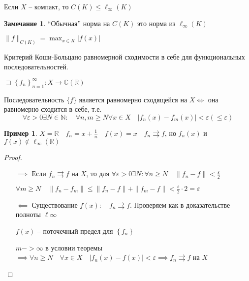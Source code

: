 \documentclass{book}
\newcommand\N{\ensuremath{\mathbb{N}}}
\newcommand\R{\ensuremath{\mathbb{R}}}
\renewcommand\C{\ensuremath{\mathbb{C}}}
\theoremstyle{definition}
\newtheorem*{note}{Замечание}
\newtheorem*{example}{Пример}
\begin{document}
    Если $X$ -- компакт, то  $C(K) \leqslant \ell _{\infty }(K)$

    \begin{note}
        ``Обычная'' норма на $C(K)$ это норма из  $\ell _{\infty }(K)$

        $\|f\|_{C(K)} = \max_{x\in K} |f(x)|$
    \end{note}

    \begin{theorem}
        Критерий Коши-Больцано равномерной сходимости в себе для функциональных последовательностей.

        $\sqsupset \left\{ f_n \right\} _{n=1}^{\infty }: X\to \C(\R)$

        Последовательность $\{f\}$ является равномерно сходящейся на  $X \iff $ она равномерно сходится в себе, т.е. \[\forall \varepsilon >0 \exists N\in \N : \quad \forall n,m\geqslant N\forall x\in X\quad |f_n(x) - f_m(x)|<\varepsilon\left( \leqslant \varepsilon \right) \]
    \end{theorem}

    \begin{example}
        $X = \R\quad f_n = x + \frac{1}{n}\quad f(x) = x\quad f_n\rightrightarrows f$, но $f_n(x)$ и  $f(x)\not\in \ell _{\infty }(\R)$ 
    \end{example}

    \begin{proof}
        \begin{itemize}
            \item []
            \item [$\implies $] Если $f_n\rightrightarrows f$ на $X$, то для  $\forall \varepsilon>0\exists N: \forall n\geqslant N\quad \|f_n - f\|<\frac{\varepsilon}{2}$

                $\forall m\geqslant N\quad \|f_n - f_m\|\leqslant \|f_n-f\| + \|f_m-f\|< \frac{\varepsilon}{2}\cdot 2 = \varepsilon$ 
            \item [$\impliedby $] Существование $f(x):\quad f_n\rightrightarrows f$. Проверяем как в доказательстве полноты $\ell {\infty }$

                $f(x)$ -- поточечный предел для  $\left\{ f_n \right\} $

                $m->\infty $ в условии теоремы $\implies \forall n\geqslant N\quad \forall x\in X\quad \left| f_n(x) - f(x) \right| <\varepsilon \implies f_n\rightrightarrows f$ на $X$
        \end{itemize}
    \end{proof}
\end{document}
